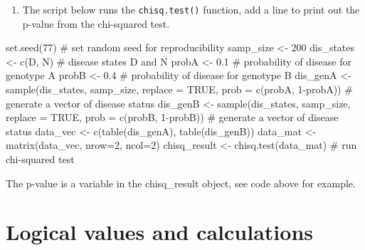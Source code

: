\documentclass[
  letterpaper,
  DIV=11,
  numbers=noendperiod]{scrreprt}
\newenvironment{Shaded}{\begin{snugshade}}{\end{snugshade}}
\newcommand{\NormalTok}[1]{\textcolor[rgb]{0.00,0.23,0.31}{#1}}
\providecommand{\tightlist}{%
  \setlength{\itemsep}{0pt}\setlength{\parskip}{0pt}}\usepackage{longtable,booktabs,array}
\begin{document}
\begin{enumerate}
\def\labelenumi{\arabic{enumi}.}
\setcounter{enumi}{2}
\tightlist
\item
  The script below runs the \texttt{chisq.test()} function, add a line
  to print out the p-value from the chi-squared test.
\end{enumerate}

\begin{Shaded}
\begin{Highlighting}[]
\NormalTok{set.seed(77) \# set random seed for reproducibility}
\NormalTok{samp\_size \textless{}{-} 200 }
\NormalTok{dis\_states \textless{}{-} c(\textquotesingle{}D\textquotesingle{}, \textquotesingle{}N\textquotesingle{}) \# disease states \textquotesingle{}D\textquotesingle{} and \textquotesingle{}N\textquotesingle{}}
\NormalTok{probA \textless{}{-} 0.1 \# probability of disease for genotype A}
\NormalTok{probB \textless{}{-} 0.4 \# probability of disease for genotype B}
\NormalTok{dis\_genA \textless{}{-} sample(dis\_states, samp\_size, replace = TRUE, prob = c(probA, 1{-}probA)) \# generate a vector of disease status}
\NormalTok{dis\_genB \textless{}{-} sample(dis\_states, samp\_size, replace = TRUE, prob = c(probB, 1{-}probB)) \# generate a vector of disease status}
\NormalTok{data\_vec \textless{}{-} c(table(dis\_genA), table(dis\_genB))}
\NormalTok{data\_mat \textless{}{-} matrix(data\_vec, nrow=2, ncol=2)}
\NormalTok{chisq\_result \textless{}{-} chisq.test(data\_mat) \# run chi{-}squared test}
\end{Highlighting}
\end{Shaded}

\begin{tcolorbox}[enhanced jigsaw, arc=.35mm, colframe=quarto-callout-caution-color-frame, left=2mm, opacitybacktitle=0.6, breakable, title=\textcolor{quarto-callout-caution-color}{\faFire}\hspace{0.5em}{Hint}, toprule=.15mm, coltitle=black, bottomtitle=1mm, toptitle=1mm, colback=white, leftrule=.75mm, colbacktitle=quarto-callout-caution-color!10!white, titlerule=0mm, opacityback=0, rightrule=.15mm, bottomrule=.15mm]

The p-value is a variable in the chisq\_result object, see code above
for example.

\end{tcolorbox}

\hypertarget{logical-values-and-calculations}{%
\section*{Logical values and
calculations}\label{logical-values-and-calculations}}
\end{document}
